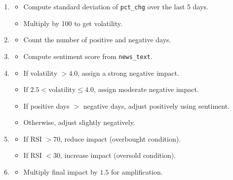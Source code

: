 \documentclass[3p,times,procedia]{elsarticle}
\begin{document}
\vspace{0.10cm}
\begin{enumerate}
    \item {}
    \begin{itemize}
        \item Compute standard deviation of \texttt{pct\_chg} over the last 5 days.
        \item Multiply by 100 to get volatility.
    \end{itemize}
    \vspace{0.40cm}
    \item {}
    \begin{itemize}
        \item Count the number of positive and negative days.
    \end{itemize}

    \item {}
    \begin{itemize}
        \item Compute sentiment score from \texttt{news\_text}.
    \end{itemize}

    \item {}
    \begin{itemize}
        \item If volatility $> 4.0$, assign a strong negative impact.
        \item If $2.5 < \text{volatility} \leq 4.0$, assign moderate negative impact.
        \item If positive days $>$ negative days, adjust positively using sentiment.
        \item Otherwise, adjust slightly negatively.
    \end{itemize}

    \item {}
    \begin{itemize}
        \item If RSI $> 70$, reduce impact (overbought condition).
        \item If RSI $< 30$, increase impact (oversold condition).
    \end{itemize}

    \item {}
    \begin{itemize}
        \item Multiply final impact by $1.5$ for amplification.
    \end{itemize}
\end{enumerate}
\end{document}
